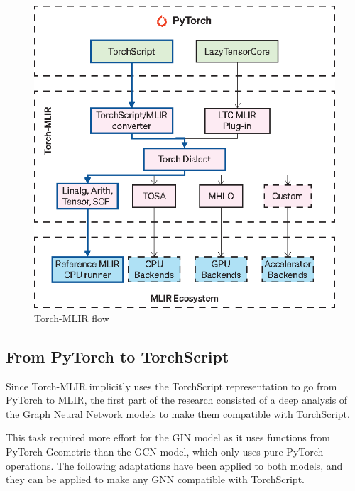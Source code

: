 \begin{figure}[t]
    \centering
    \includegraphics[height=0.5\textwidth]{Images/torch-mlir}
    \caption{Torch-MLIR flow}
    \label{fig:torch-mlir}
\end{figure}

\subsection{From PyTorch to TorchScript}
\label{subsec:pytorch-to-torchscript}%

Since Torch-MLIR implicitly uses the TorchScript representation to go from PyTorch to MLIR, the first part of the research consisted of a deep analysis of the Graph Neural Network models to make them compatible with TorchScript.

This task required more effort for the GIN model as it uses functions from PyTorch Geometric than the GCN model, which only uses pure PyTorch operations.
The following adaptations have been applied to both models, and they can be applied to make any GNN compatible with TorchScript.

